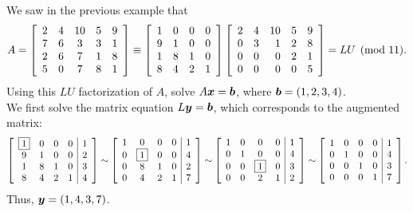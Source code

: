 \begin{Exam}\label{LU} We saw in the previous example that 
\[A = \mtx{ccccc}{2&4&10&5&9\\7&6&3&3&1\\2&6&7&1&8\\5&0&7&8&1} \equiv  \mtx{rrrr}{1&0&0&0\\9&1&0&0\\1&8 &1&0\\8&4 & 2 &1}\mtx{rrrrr}{2&4&10&5&9\\0&3&1&2&8\\0&0&0&2&1\\0&0&0&0&5} = LU \pmod{11}.\] Using this $LU$ factorization of $A$, solve $A\bb x = \bb b$, where $\bb b = (1,2,3,4)$.\\

We first solve the matrix equation $L\bb y = \bb b$, which corresponds to the augmented matrix: 
\[\mtx{cccc|c}{\fbox{1}&0&0&0&1\\9&1&0&0&2\\1&8&1&0&3\\8&4&2&1&4} \sim \mtx{cccc|c}{1&0&0&0&1\\0&\fbox{1}&0&0&4\\0&8&1&0&2\\0&4&2&1&7} \sim \mtx{cccc|c}{1&0&0&0&1\\0&1&0&0&4\\0&0&\fbox{1}&0&3\\0&0&2&1&2}
\sim \mtx{cccc|c}{1&0&0&0&1\\0&1&0&0&4\\0&0&1&0&3\\0&0&0&1&7}.\] Thus, $\bb y = (1,4,3,7)$. 


\end{Exam}

